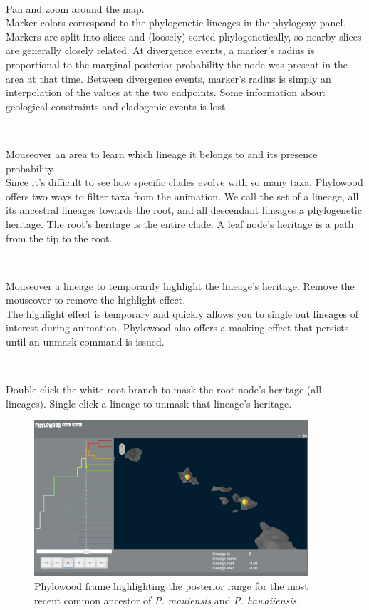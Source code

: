 \documentclass[11pt]{article}
\newcommand{\impmark}{\strut\vadjust{\domark}}
\newcommand{\domark}{%
  \vbox to 0pt{
    \kern-\dp\strutbox
    \smash{\llap{$\rightarrow$\kern1em}}
    \vss
  }%
}
\begin{document}
\noindent \\ \impmark Pan and zoom around the map.\\

Marker colors correspond to the phylogenetic lineages in the phylogeny panel.
Markers are split into slices and (loosely) sorted phylogenetically, so nearby slices are generally closely related.
At divergence events, a marker's radius is proportional to the marginal posterior probability the node was present in the area at that time.
Between divergence events, marker's radius is simply an interpolation of the values at the two endpoints.
Some information about geological constraints and cladogenic events is lost.

\noindent \\ \impmark Mouseover an area to learn which lineage it belongs to and its presence probability. \\

Since it's difficult to see how specific clades evolve with so many taxa, Phylowood offers two ways to filter taxa from the animation.
We call the set of a lineage, all its ancestral lineages towards the root, and all descendant lineages a phylogenetic heritage.
The root's heritage is the entire clade.
A leaf node's heritage is a path from the tip to the root.

\noindent \\ \impmark Mouseover a lineage to temporarily highlight the lineage's heritage. Remove the mouseover to remove the highlight effect. \\

The highlight effect is temporary and quickly allows you to single out lineages of interest during animation.
Phylowood also offers a masking effect that persists until an unmask command is issued.

\noindent \\ \impmark Double-click the white root branch to mask the root node's heritage (all lineages). Single click a lineage to unmask that lineage's heritage. \\

\begin{figure}[H]
\centering
\includegraphics[width=4in]{figures/phw_br23}
\caption{Phylowood frame highlighting the posterior range for the most recent common ancestor of {\it P. mauiensis} and {\it P. hawaiiensis}.}
\end{figure}
\end{document}
